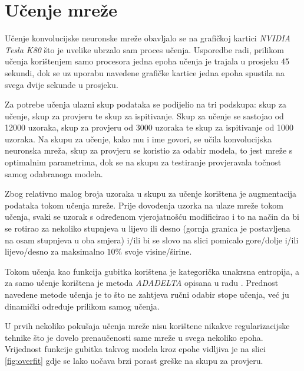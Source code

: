 \section{Učenje mreže}

Učenje konvolucijske neuronske mreže obavljalo se na grafičkoj kartici \emph{NVIDIA Tesla K80} što je uvelike ubrzalo sam proces učenja. Usporedbe radi, prilikom učenja korištenjem samo procesora jedna epoha učenja je trajala u prosjeku 45 sekundi, dok se uz uporabu navedene grafičke kartice jedna epoha spustila na svega dvije sekunde u prosjeku.

Za potrebe učenja ulazni skup podataka se podijelio na tri podskupa: skup za učenje, skup za provjeru te skup za ispitivanje. Skup za učenje se sastojao od \num{12000} uzoraka, skup za provjeru od \num{3000} uzoraka te skup za ispitivanje od \num{1000} uzoraka. Na skupu za učenje, kako mu i ime govori, se učila konvolucijska neuronska mreža, skup za provjeru se koristio za odabir modela, to jest mreže s optimalnim parametrima, dok se na skupu za testiranje provjeravala točnost samog odabranoga modela.

Zbog relativno malog broja uzoraka u skupu za učenje korištena je augmentacija podataka tokom učenja mreže. Prije dovođenja uzorka na ulaze mreže tokom učenja, svaki se uzorak s određenom vjerojatnošću modificirao i to na način da bi se rotirao za nekoliko stupnjeva u lijevo ili desno (gornja granica je postavljena na osam stupnjeva u oba smjera) i/ili bi se slovo na slici pomicalo gore/dolje i/ili lijevo/desno za maksimalno $10\%$ svoje visine/širine.

Tokom učenja kao funkcija gubitka korištena je kategorička unakrsna entropija, a za samo učenje korištena je metoda \emph{ADADELTA} opisana u radu \citep{adadelta}. Prednost navedene metode učenja je to što ne zahtjeva ručni odabir stope učenja, već ju dinamički određuje prilikom samog učenja.

U prvih nekoliko pokušaja učenja mreže nisu korištene nikakve regularizacijske tehnike što je dovelo prenaučenosti same mreže u svega nekoliko epoha. Vrijednost funkcije gubitka takvog modela kroz epohe vidljiva je na slici \ref{fig:overfit} gdje se lako uočava brzi porast greške na skupu za provjeru. 

